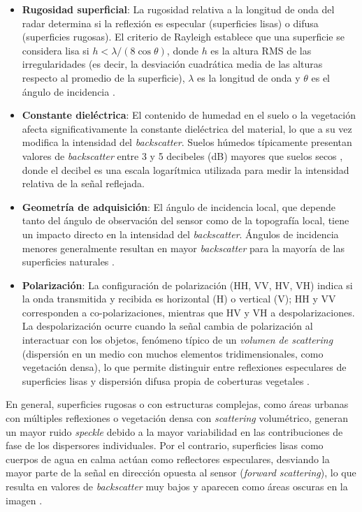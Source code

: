 \begin{itemize}
	\item \textbf{Rugosidad superficial}: La rugosidad relativa a la longitud de onda del radar determina si la reflexión es especular (superficies lisas) o difusa (superficies rugosas). El criterio de Rayleigh establece que una superficie se considera lisa si $h < \lambda/(8\cos\theta)$, donde $h$ es la altura RMS de las irregularidades (es decir, la desviación cuadrática media de las alturas respecto al promedio de la superficie), $\lambda$ es la longitud de onda y $\theta$ es el ángulo de incidencia \cite{fung2019microwave}.
	
	\item \textbf{Constante dieléctrica}: El contenido de humedad en el suelo o la vegetación afecta significativamente la constante dieléctrica del material, lo que a su vez modifica la intensidad del \emph{backscatter}. Suelos húmedos típicamente presentan valores de \emph{backscatter} entre 3 y 5 decibeles (dB) mayores que suelos secos \cite{dubois1995measuring}, donde el decibel es una escala logarítmica utilizada para medir la intensidad relativa de la señal reflejada.
	
	\item \textbf{Geometría de adquisición}: El ángulo de incidencia local, que depende tanto del ángulo de observación del sensor como de la topografía local, tiene un impacto directo en la intensidad del \emph{backscatter}. Ángulos de incidencia menores generalmente resultan en mayor \emph{backscatter} para la mayoría de las superficies naturales \cite{freeman1992calibration}.
	
	\item \textbf{Polarización}: La configuración de polarización (HH, VV, HV, VH) indica si la onda transmitida y recibida es horizontal (H) o vertical (V); HH y VV corresponden a co-polarizaciones, mientras que HV y VH a despolarizaciones. La despolarización ocurre cuando la señal cambia de polarización al interactuar con los objetos, fenómeno típico de un \emph{volumen de scattering} (dispersión en un medio con muchos elementos tridimensionales, como vegetación densa), lo que permite distinguir entre reflexiones especulares de superficies lisas y dispersión difusa propia de coberturas vegetales \cite{cloude1997entropy}.
\end{itemize}

En general, superficies rugosas o con estructuras complejas, como áreas urbanas con múltiples reflexiones o vegetación densa con \emph{scattering} volumétrico, generan un mayor ruido \emph{speckle} debido a la mayor variabilidad en las contribuciones de fase de los dispersores individuales. Por el contrario, superficies lisas como cuerpos de agua en calma actúan como reflectores especulares, desviando la mayor parte de la señal en dirección opuesta al sensor (\emph{forward scattering}), lo que resulta en valores de \emph{backscatter} muy bajos y aparecen como áreas oscuras en la imagen \cite{lee2009polarimetric}.

